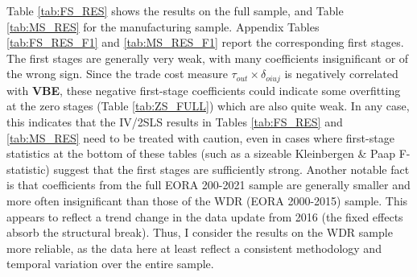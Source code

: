 \documentclass[a4paper]{article}
\begin{document}
Table \ref{tab:FS_RES} shows the results on the full sample, and Table \ref{tab:MS_RES} for the manufacturing sample. Appendix Tables \ref{tab:FS_RES_F1} and \ref{tab:MS_RES_F1} report the corresponding first stages. The first stages are generally very weak, with many coefficients insignificant or of the wrong sign. Since the trade cost measure $\tau_{out}\times \delta_{oiuj}$ is negatively correlated with \textbf{VBE}, these negative first-stage coefficients could indicate some overfitting at the zero stages (Table \ref{tab:ZS_FULL}) which are also quite weak. In any case, this indicates that the IV/2SLS results in Tables \ref{tab:FS_RES} and \ref{tab:MS_RES} need to be treated with caution, even in cases where first-stage statistics at the bottom of these tables (such as a sizeable Kleinbergen \& Paap F-statistic) suggest that the first stages are sufficiently strong. Another notable fact is that coefficients from the full EORA 200-2021 sample are generally smaller and more often insignificant than those of the WDR (EORA 2000-2015) sample. This appears to reflect a trend change in the data update from 2016 (the fixed effects absorb the structural break). Thus, I consider the results on the WDR sample more reliable, as the data here at least reflect a consistent methodology and temporal variation over the entire sample. 
\end{document}
